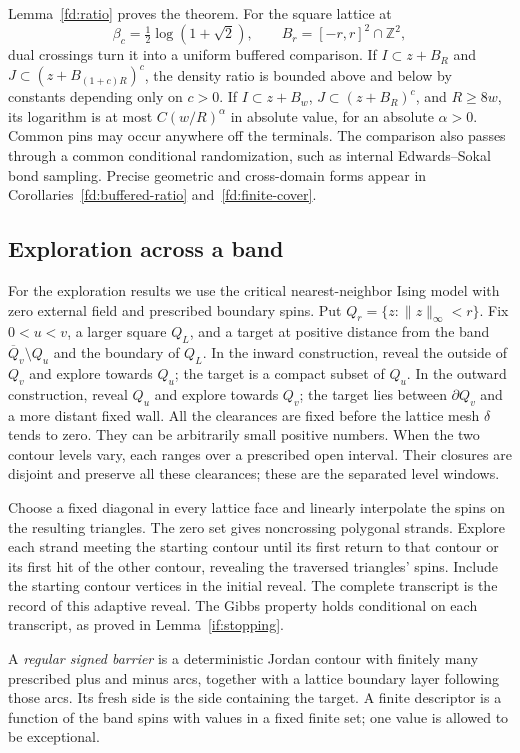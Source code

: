 Lemma~\ref{fd:ratio} proves the theorem. For the square lattice at
\[
 \beta_c=\tfrac12\log(1+\sqrt2),\qquad
 B_r=[-r,r]^2\cap\mathbb Z^2,
\]
dual crossings turn it into a uniform buffered comparison. If
$I\subset z+B_R$ and $J\subset(z+B_{(1+c)R})^c$, the density ratio
is bounded above and below by constants depending only on $c>0$.
If $I\subset z+B_w$, $J\subset(z+B_R)^c$, and $R\ge8w$, its
logarithm is at most $C(w/R)^\alpha$ in absolute value, for an
absolute $\alpha>0$. Common pins may occur anywhere off the terminals.
The comparison also passes through a common conditional randomization,
such as internal Edwards--Sokal bond sampling. Precise geometric and
cross-domain forms appear in Corollaries~\ref{fd:buffered-ratio}
and~\ref{fd:finite-cover}.

\subsection{Exploration across a band}
For the exploration results we use the critical nearest-neighbor Ising
model with zero external field and prescribed boundary spins.
Put $Q_r=\{z:\|z\|_\infty<r\}$. Fix $0<u<v$, a larger square
$Q_L$, and a target at positive distance from the band
$\overline Q_v\setminus Q_u$ and the boundary of $Q_L$.
In the inward construction, reveal the outside of $Q_v$ and explore
towards $Q_u$; the target is a compact subset of $Q_u$. In the outward
construction, reveal $Q_u$ and explore towards $Q_v$; the target lies
between $\partial Q_v$ and a more distant fixed wall. All the
clearances are fixed before the lattice mesh $\delta$ tends to zero.
They can be arbitrarily small positive numbers.
When the two contour levels vary, each ranges over a prescribed open
interval. Their closures are disjoint and preserve all these clearances;
these are the separated level windows.

Choose a fixed diagonal in every lattice face and linearly interpolate
the spins on the resulting triangles. The zero set gives noncrossing
polygonal strands. Explore each strand meeting the starting contour
until its first return to that contour or its first hit of the other
contour, revealing the traversed triangles' spins. Include the starting
contour vertices in the initial reveal. The complete transcript is the
record of this adaptive reveal. The Gibbs property holds conditional on
each transcript, as proved in Lemma~\ref{if:stopping}.

A \emph{regular signed barrier} is a deterministic Jordan contour with
finitely many prescribed plus and minus arcs, together with a lattice
boundary layer following those arcs. Its fresh side is the side containing
the target. A finite descriptor is a function of the band spins with values
in a fixed finite set; one value is allowed to be exceptional.

